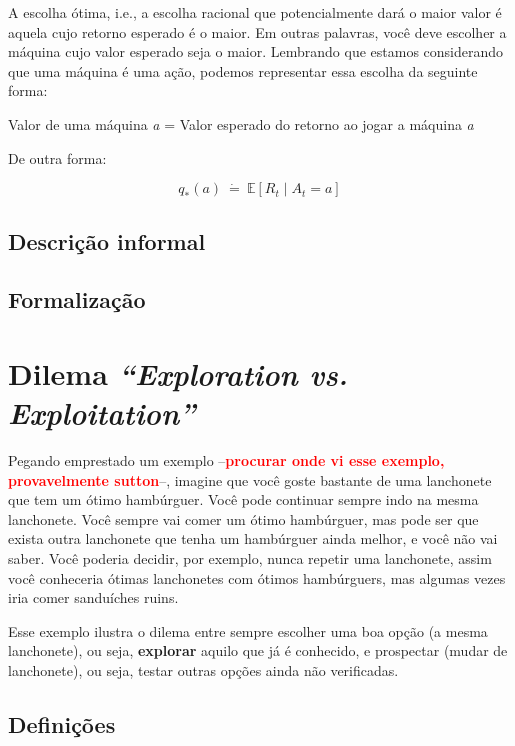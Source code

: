 \documentclass{article}
\newcommand{\todo}[1]{ --\textcolor{red}{\textbf{#1}}--}
\begin{document}
        A escolha ótima, i.e., a escolha racional que potencialmente dará o maior valor é aquela cujo retorno esperado é o maior. Em outras palavras, você deve escolher a máquina cujo valor esperado seja o maior. Lembrando que estamos considerando que uma máquina é uma ação, podemos representar essa escolha da seguinte forma:
        
        Valor de uma máquina \textit{a} = Valor esperado do retorno ao jogar a máquina \textit{a}
        
        De outra forma:
        
        \begin{equation}
            q_*(a) \ \dot{=} \ \mathbb{E}[R_t \mid A_t = a]
        \end{equation}
    
        \subsection{Descrição informal}
        
        \subsection{Formalização}
    
    \section{Dilema \textit{``Exploration vs. Exploitation''}}
    
        Pegando emprestado um exemplo \todo{procurar onde vi esse exemplo, provavelmente sutton}, imagine que você goste bastante de uma lanchonete que tem um ótimo hambúrguer. Você pode continuar sempre indo na mesma lanchonete. Você sempre vai comer um ótimo hambúrguer, mas pode ser que exista outra lanchonete que tenha um hambúrguer ainda melhor, e você não vai saber. Você poderia decidir, por exemplo, nunca repetir uma lanchonete, assim você conheceria ótimas lanchonetes com ótimos hambúrguers, mas algumas vezes iria comer sanduíches ruins.
        
        Esse exemplo ilustra o dilema entre sempre escolher uma boa opção (a mesma lanchonete), ou seja, \textbf{explorar} aquilo que já é conhecido, e prospectar (mudar de lanchonete), ou seja, testar outras opções ainda não verificadas. 
    
        \subsection{Definições}
        
\end{document}
